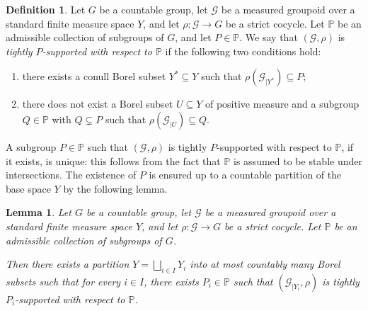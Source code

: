 \documentclass[JEP,XML,SOM,Unicode,NoFloatCountersInSection,published]{cedram}
\let\mathcal\mathscr
\theoremstyle{plain}
\newtheorem{lemma}[theo]{Lemma}
\theoremstyle{definition}
\newtheorem{de}[theo]{Definition}
\let\Dunion\bigsqcup
\newcommand{\calg}{\mathcal{G}}
\begin{document}
\begin{de}
Let $G$ be a countable group, let $\mathcal{G}$ be a measured groupoid over a standard finite measure space $Y$, and let $\rho:\calg\to G$ be a strict cocycle. Let $\mathbb{P}$ be an admissible collection of subgroups of $G$, and let $P\in\mathbb{P}$. We say that $(\calg,\rho)$ is \emph{tightly $P$-supported with respect to $\mathbb{P}$} if the following two conditions hold:
\begin{enumerate}
\item there exists a conull Borel subset $Y^*\subseteq Y$ such that $\rho(\calg_{|Y^*})\subseteq P$;
\item there does not exist a Borel subset $U\subseteq Y$ of positive measure and a subgroup $Q\in\mathbb{P}$ with $Q\subsetneq P$ such that $\rho(\calg_{|U})\subseteq Q$.
\end{enumerate}
\end{de}

A subgroup $P\in\mathbb{P}$ such that $(\calg,\rho)$ is tightly $P$-supported with respect to $\mathbb{P}$, if it exists, is unique: this follows from the fact that $\mathbb{P}$ is assumed to be stable under intersections. The existence of $P$ is ensured up to a countable partition of the base space $Y$ by the following lemma.

\begin{lemma}\label{lemma:support}
Let $G$ be a countable group, let $\calg$ be a measured groupoid over a standard finite measure space $Y$, and let $\rho:\calg\to G$ be a strict cocycle. Let $\mathbb{P}$ be an admissible collection of subgroups of $G$.

Then there exists a partition $Y=\Dunion_{i\in I}Y_i$ into at most countably many Borel subsets such that for every $i\in I$, there exists $P_i\in\mathbb{P}$ such that $(\calg_{|Y_i},\rho)$ is tightly $P_i$-supported with respect to $\mathbb{P}$.
\end{lemma}
\end{document}
